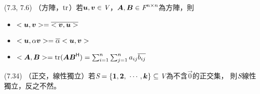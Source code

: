 \item \begin{theorem}{(7.3, 7.6)} （方陣，$\operatorname{tr}$）若$\boldsymbol{u}, \boldsymbol{v} \in \textit{V}$，$\boldsymbol{A}, \boldsymbol{B} \in \textit{F}^{n \times n}$為方陣，則
	\begin{itemize}
		\item $<\boldsymbol{u}, \boldsymbol{v}> = \overline{<\boldsymbol{v}, \boldsymbol{u}>}$
		\item $<\boldsymbol{u}, \alpha \boldsymbol{v}> = \overline{\alpha}<\boldsymbol{u}, \boldsymbol{v}>$
		\item $<\boldsymbol{A}, \boldsymbol{B}> = \operatorname{tr}(\boldsymbol{AB}^{\mathsf{H}}) = \sum_{i = 1}^{n}\sum_{j = 1}^{n}a_{ij}\overline{b_{ij}}$
	\end{itemize}
\end{theorem}

\item \begin{theorem}{(7.34)} （正交，線性獨立）若$\textit{S} = \{\boldsymbol{1}, \boldsymbol{2}, \ \cdots, \boldsymbol{k}\} \subseteq \textit{V}$為不含$\vec{0}$的正交集，
	則$\textit{S}$線性獨立，反之不然。
\end{theorem}


